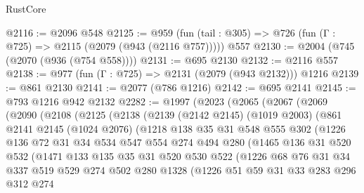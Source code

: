 \begin{lexlean}{RustCore}
\begin{coremodule}
@2116 := @2096 @548
@2125 := @959 (fun (tail : @305) => @726 (fun (Γ : @725) => @2115 (@2079 (@943 (@2116 @757))))) @557
@2130 := @2004 (@745 (@2070 (@936 (@754 @558))))
@2131 := @695 @2130
@2132 := @2116 @557
@2138 := @977 (fun (Γ : @725) => @2131 (@2079 (@943 @2132))) @1216
@2139 := @861 @2130
@2141 := @2077 (@786 @1216)
@2142 := @695 @2141
@2145 := @793 @1216 @942 @2132
@2282 := @1997
    (@2023
      (@2065
        (@2067
          (@2069
            (@2090
              (@2108
                (@2125
                  (@2138
                    (@2139
                      (@2142 @2145)
                      (@1019 @2003)
                      (@861
                        @2141
                        @2145
                        (@1024 @2076)
                        (@1218
                          @138
                          @35
                          @31
                          @548
                          @555
                          @302
                          (@1226
                            @136
                            @72
                            @31
                            @34
                            @534
                            @547
                            @554
                            @274
                            @494
                            @280
                            (@1465
                              @136
                              @31
                              @520
                              @532
                              (@1471
                                @133
                                @135
                                @35
                                @31
                                @520
                                @530
                                @522
                                (@1226
                                  @68
                                  @76
                                  @31
                                  @34
                                  @337
                                  @519
                                  @529
                                  @274
                                  @502
                                  @280
                                  @1328
                                  (@1226
                                    @51
                                    @59
                                    @31
                                    @33
                                    @283
                                    @296
                                    @312
                                    @274

\end{coremodule}
\end{lexlean}
